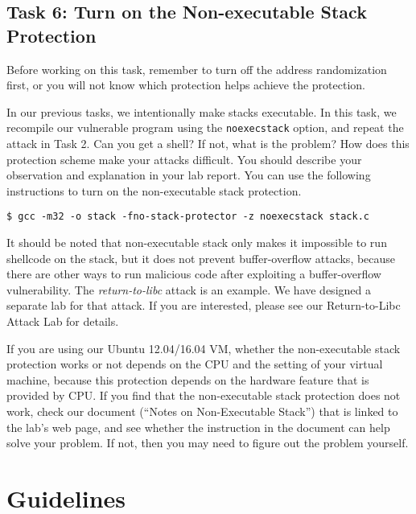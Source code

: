 \subsection{Task 6: Turn on the Non-executable Stack Protection}

Before working on this task, remember to turn off the address
randomization first, or you will not know which protection helps 
achieve the protection.

In our previous tasks, we intentionally make stacks executable.
In this task, we recompile our vulnerable program 
using the {\tt noexecstack} option, and repeat the attack in
Task 2. Can you get a shell? If not, what is the problem? How does
this protection scheme make your attacks difficult. 
You should describe your observation and explanation
in your lab report. You can use the following instructions to turn
on the non-executable stack protection.

\begin{lstlisting}
$ gcc -m32 -o stack -fno-stack-protector -z noexecstack stack.c
\end{lstlisting}


It should be noted that non-executable stack only makes it impossible to run shellcode 
on the stack, but it does not prevent buffer-overflow attacks, 
because there are other ways to run malicious code after exploiting 
a buffer-overflow vulnerability. The {\em return-to-libc} attack
is an example. We have designed a separate lab for that 
attack. If you are interested, please see our 
Return-to-Libc Attack Lab for details.


If you are using our Ubuntu 12.04/16.04 VM, whether the non-executable stack
protection works or not depends on the CPU and the setting of your virtual
machine, because this
protection depends on the hardware feature that is provided by CPU. If you 
find that the non-executable stack protection does not work, check our
document (``Notes on Non-Executable Stack'') that is linked to the lab's web page, and see whether the
instruction in the document can help solve your problem. If not, then you
may need to figure out the problem yourself.




\section{Guidelines}


